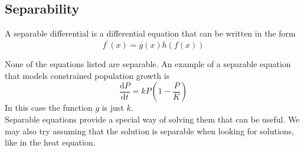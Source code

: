 \subsection{Separability}
\begin{definition}
	A separable differential is a differential equation that can be written in the form
	\begin{equation*}
		f^\prime(x) = g(x)h(f(x))
	\end{equation*}
\end{definition}

\noindent
None of the equations listed are separable. An example of a separable equation that models constrained population growth is
\begin{equation*}
	\frac{\mathrm{d} P}{\mathrm{d} t} = kP\left(1 - \frac{P}{K}\right)
\end{equation*}
\noindent
In this case the function $g$ is just $k$.\\

\noindent
Separable equations provide a special way of solving them that can be useful. We may also try assuming that the solution is separable when looking for solutions, like in the heat equation.\\